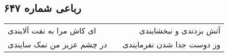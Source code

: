 \begin{center}
\section*{رباعی شماره ۶۴۷}
\label{sec:sh647}
\begin{longtable}{l p{0.5cm} r}
ای کاش مرا به نفت آلایندی
&&
آتش بزدندی و نبخشایندی
\\
در چشم عزیز من نمک سایندی
&&
وز دوست جدا شدن نفرمایندی
\\
\end{longtable}
\end{center}
